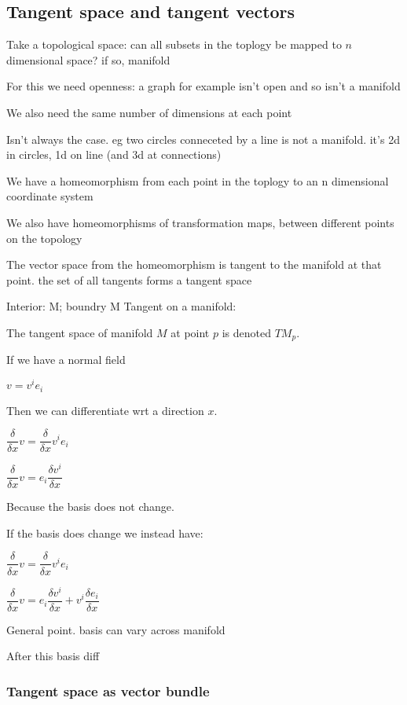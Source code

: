 
\subsection{Tangent space and tangent vectors}

Take a topological space: can all subsets in the toplogy be mapped to \(n\) dimensional space? if so, manifold

For this we need openness: a graph for example isn't open and so isn't a manifold

We also need the same number of dimensions at each point

Isn't always the case. eg two circles conneceted by a line is not a manifold. it's 2d in circles, 1d on line (and 3d at connections)

We have a homeomorphism from each point in the toplogy to an n dimensional coordinate system

We also have homeomorphisms of transformation maps, between different points on the topology

The vector space from the homeomorphism is tangent to the manifold at that point. the set of all tangents forms a tangent space

Interior: M; boundry \delta M
Tangent on a manifold:

The tangent space of manifold \(M\) at point \(p\) is denoted \(TM_p\).

If we have a normal field

\(v=v^ie_i\)

Then we can differentiate wrt a direction \(x\).

\(\dfrac{\delta }{\delta x}v=\dfrac{\delta }{\delta x}v^ie_i\)

\(\dfrac{\delta }{\delta x}v=e_i\dfrac{\delta v^i}{\delta x}\)

Because the basis does not change.

If the basis does change we instead have:

\(\dfrac{\delta }{\delta x}v=\dfrac{\delta }{\delta x}v^ie_i\)

\(\dfrac{\delta }{\delta x}v=e_i\dfrac{\delta v^i}{\delta x}+v^i\dfrac{\delta e_i }{\delta x}\)

General point. basis can vary across manifold

After this basis diff

\subsubsection{Tangent space as vector bundle}


